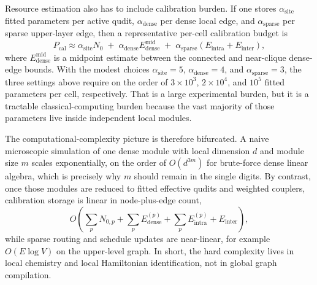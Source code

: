 \documentclass[11pt]{report}
\theoremstyle{definition}
\begin{document}
Resource estimation also has to include calibration burden. If one stores $\alpha_{\mathrm{site}}$ fitted parameters per active qudit, $\alpha_{\mathrm{dense}}$ per dense local edge, and $\alpha_{\mathrm{sparse}}$ per sparse upper-layer edge, then a representative per-cell calibration budget is
\begin{equation}
P_{\mathrm{cal}}
\approx
\alpha_{\mathrm{site}}N_0
\;+\;
\alpha_{\mathrm{dense}}E_{\mathrm{dense}}^{\mathrm{mid}}
\;+\;
\alpha_{\mathrm{sparse}}\!\left(E_{\mathrm{intra}}+E_{\mathrm{inter}}\right),
\label{eq:Pcal}
\end{equation}
where $E_{\mathrm{dense}}^{\mathrm{mid}}$ is a midpoint estimate between the connected and near-clique dense-edge bounds. With the modest choices $\alpha_{\mathrm{site}}=5$, $\alpha_{\mathrm{dense}}=4$, and $\alpha_{\mathrm{sparse}}=3$, the three settings above require on the order of $3\times10^3$, $2\times10^4$, and $10^5$ fitted parameters per cell, respectively. That is a large experimental burden, but it is a tractable classical-computing burden because the vast majority of those parameters live inside independent local modules.

The computational-complexity picture is therefore bifurcated. A naive microscopic simulation of one dense module with local dimension $d$ and module size $m$ scales exponentially, on the order of $O(d^{3m})$ for brute-force dense linear algebra, which is precisely why $m$ should remain in the single digits. By contrast, once those modules are reduced to fitted effective qudits and weighted couplers, calibration storage is linear in node-plus-edge count,
\[
O\!\left(\sum_p N_{0,p} + \sum_p E^{(p)}_{\mathrm{dense}} + \sum_p E^{(p)}_{\mathrm{intra}} + E_{\mathrm{inter}}\right),
\]
while sparse routing and schedule updates are near-linear, for example $O(E\log V)$ on the upper-level graph. In short, the hard complexity lives in local chemistry and local Hamiltonian identification, not in global graph compilation.
\end{document}
